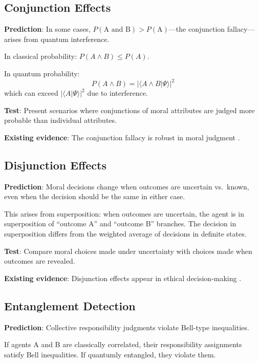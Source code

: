 \documentclass[12pt]{article}
\begin{document}
\subsection{Conjunction Effects}

\textbf{Prediction}: In some cases, $P(\text{A and B}) > P(\text{A})$---the conjunction fallacy---arises from quantum interference.

In classical probability: $P(A \wedge B) \leq P(A)$.

In quantum probability:
\begin{equation}
    P(A \wedge B) = |\langle A \wedge B | \Psi \rangle|^2
\end{equation}
which can exceed $|\langle A | \Psi \rangle|^2$ due to interference.

\textbf{Test}: Present scenarios where conjunctions of moral attributes are judged more probable than individual attributes.

\textbf{Existing evidence}: The conjunction fallacy is robust in moral judgment \cite{tversky1983}.

\subsection{Disjunction Effects}

\textbf{Prediction}: Moral decisions change when outcomes are uncertain vs.\ known, even when the decision should be the same in either case.

This arises from superposition: when outcomes are uncertain, the agent is in superposition of ``outcome A'' and ``outcome B'' branches. The decision in superposition differs from the weighted average of decisions in definite states.

\textbf{Test}: Compare moral choices made under uncertainty with choices made when outcomes are revealed.

\textbf{Existing evidence}: Disjunction effects appear in ethical decision-making \cite{tversky1992}.

\subsection{Entanglement Detection}

\textbf{Prediction}: Collective responsibility judgments violate Bell-type inequalities.

If agents A and B are classically correlated, their responsibility assignments satisfy Bell inequalities. If quantumly entangled, they violate them.
\end{document}
